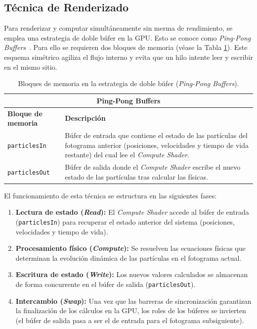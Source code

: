 \subsection{Técnica de Renderizado}
\label{sec:tecnica_renderizado}
Para renderizar y computar simultáneamente sin merma de rendimiento, se emplea una estrategia de doble búfer en la GPU. Esto se conoce como \textit{Ping-Pong Buffers}~\parencite{akenine2018real}. 
Para ello se requieren dos bloques de memoria (véase la Tabla \ref{tab:ping_pong_buffers}). Este esquema simétrico agiliza el flujo interno y evita 
que un hilo intente leer y escribir en el mismo sitio.

\begin{table}[ht]
    \centering
    \renewcommand{\arraystretch}{1.2}
    \begin{tabular}{|l|p{}|}
        \hline
        \multicolumn{2}{|c|}{\textbf{Ping-Pong Buffers}} \\ \hline
        \textbf{Bloque de memoria} & \textbf{Descripción} \\ \hline
        \texttt{particlesIn} & Búfer de entrada que contiene el estado de las partículas del fotograma anterior (posiciones, velocidades y tiempo de vida restante) del cual lee el \textit{Compute Shader}. \\ \hline
        \texttt{particlesOut} & Búfer de salida donde el \textit{Compute Shader} escribe el nuevo estado de las partículas tras calcular las físicas. \\ \hline
    \end{tabular}
    \caption{Bloques de memoria en la estrategia de doble búfer (\textit{Ping-Pong Buffers}).}
    \label{tab:ping_pong_buffers}
\end{table} 

El funcionamiento de esta técnica se estructura en las siguientes fases:
\begin{enumerate}
    \item \textbf{Lectura de estado (\textit{Read}):} El \textit{Compute Shader} accede al búfer de entrada (\texttt{particlesIn}) para recuperar el estado anterior del sistema (posiciones, velocidades y tiempo de vida).
    \item \textbf{Procesamiento físico (\textit{Compute}):} Se resuelven las ecuaciones físicas que determinan la evolución dinámica de las partículas en el fotograma actual.
    \item \textbf{Escritura de estado (\textit{Write}):} Los nuevos valores calculados se almacenan de forma concurrente en el búfer de salida (\texttt{particlesOut}).
    \item \textbf{Intercambio (\textit{Swap}):} Una vez que las barreras de sincronización garantizan la finalización de los cálculos en la GPU, los roles de los búferes se invierten (el búfer de salida pasa a ser el de entrada para el fotograma subsiguiente).
\end{enumerate}

